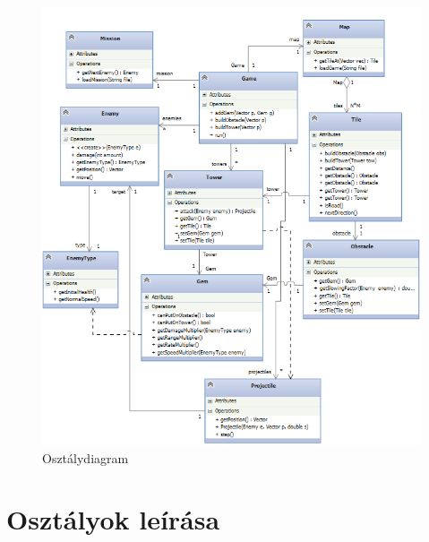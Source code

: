 \begin{figure}[H]
\begin{center}
\includegraphics[width=17cm]{images/class.png}
\caption{Osztálydiagram}
\label{fig:class_diag}
\end{center}
\end{figure}


\section{Osztályok leírása}



